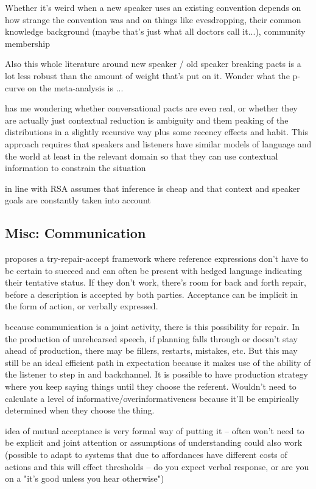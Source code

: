 \documentclass[]{article}
\begin{document}
 Whether it's weird when a new speaker uses an existing convention depends on how strange the convention was and on things like evesdropping, their common knowledge background (maybe that's just what all doctors call it...), community membership
 
 Also this whole literature around new speaker / old speaker breaking pacts is a lot less robust than the amount of weight that's put on it. Wonder what the p-curve on the meta-analysis is ... 
 
 \cite{piantadosi2012} has me wondering whether conversational pacts are even real, or whether they are actually just contextual reduction is ambiguity and them peaking of the distributions in a slightly recursive way plus some recency effects and habit. This approach requires that speakers and listeners have similar models of language and the world at least in the relevant domain so that they can use contextual information to constrain the situation 
 
 \cite{piantadosi2012} in line with RSA assumes that inference is cheap and that context and speaker goals are constantly taken into account 

\subsection{Misc: Communication}

\cite{clark1986} proposes a try-repair-accept framework where reference expressions don't have to be certain to succeed and can often be present with hedged language indicating their tentative status. If they don't work, there's room for back and forth repair, before a description is accepted by both parties. Acceptance can be implicit in the form of action, or verbally expressed. 

\cite{clark1986} because communication is a joint activity, there is this possibility for repair. In the production of unrehearsed speech, if planning falls through or doesn't stay ahead of production, there may be fillers, restarts, mistakes, etc. But this may still be an ideal efficient path in expectation because it makes use of the ability of the listener to step in and backchannel. It is possible to have production strategy where you keep saying things until they choose the referent. Wouldn't need to calculate a level of informative/overinformativeness because it'll be empirically determined when they choose the thing. 

\cite{clark1986} idea of mutual acceptance is very formal way of putting it -- often won't need to be explicit and joint attention or assumptions of understanding could also work (possible to adapt to systems that due to affordances have different costs of actions and this will effect thresholds -- do you expect verbal response, or are you on a "it's good unless you hear otherwise") 
\end{document}
